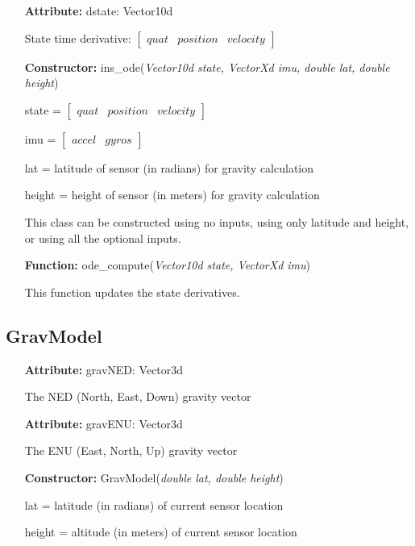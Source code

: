 \documentclass[11pt,a4paper]{article}
\begin{document}
	\begin{itemize}
		\item[\textbf{Attribute:}] dstate:  Vector10d
		
		State time derivative: $\left[\begin{array}{ccc}quat & position & velocity\end{array}\right]$
		
		\item[\textbf{Constructor:}] ins\_ode(\textit{Vector10d state, VectorXd imu, double lat, double height})
		
		state = $\left[\begin{array}{ccc}quat & position & velocity\end{array}\right]$ 
		
        imu = $\left[\begin{array}{cc} accel & gyros\end{array}\right]$
        
        lat = latitude of sensor (in radians) for gravity calculation
        
        height = height of sensor (in meters) for gravity calculation
        
        This class can be constructed using no inputs, using only latitude and height, or using all the optional inputs.
        
        \item[\textbf{Function:}] ode\_compute(\textit{Vector10d state, VectorXd imu})
        
        This function updates the state derivatives.
	\end{itemize}
	
	\subsection{GravModel}
	
	\begin{itemize}
		\item[\textbf{Attribute:}] gravNED:  Vector3d
		
		The NED (North, East, Down) gravity vector		
		
		\item[\textbf{Attribute:}] gravENU:  Vector3d
		
		The ENU (East, North, Up) gravity vector
		
		\item[\textbf{Constructor:}] GravModel(\textit{double lat, double height})
		
		lat = latitude (in radians) of current sensor location
        
        height = altitude (in meters) of current sensor location
	\end{itemize}
\end{document}

